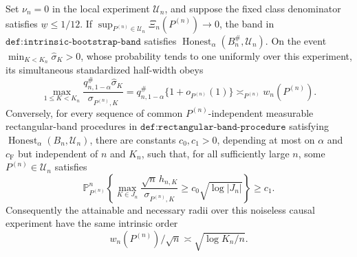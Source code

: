 Set \(\nu_n=0\) in the local experiment \(\mathcal U_n\), and suppose the fixed class denominator satisfies \(\underline w\leq1/12\).  If \(\sup_{P^{(n)}\in\mathcal U_n}\Xi_n(P^{(n)})\to0\), the band in \(\texttt{def:intrinsic-bootstrap-band}\) satisfies \(\operatorname{Honest}_{\alpha}(B_n^{\#},\mathcal U_n)\).  On the event \(\min_{K<K_n}\widehat\sigma_K>0\), whose probability tends to one uniformly over this experiment, its simultaneous standardized half-width obeys
\[
 \max_{1\leq K<K_n}\frac{q_{n,1-\alpha}^{\#}\widehat\sigma_K}{\sigma_{P^{(n)},K}}
 =q_{n,1-\alpha}^{\#}\{1+o_{P^{(n)}}(1)\}
 \asymp_{P^{(n)}}w_n(P^{(n)}).
\]
Conversely, for every sequence of common \(P^{(n)}\)-independent measurable rectangular-band procedures in \(\texttt{def:rectangular-band-procedure}\) satisfying \(\operatorname{Honest}_{\alpha}(B_n,\mathcal U_n)\), there are constants \(c_0,c_1>0\), depending at most on \(\alpha\) and \(c_{\mathrm F}\) but independent of \(n\) and \(K_n\), such that, for all sufficiently large \(n\), some \(P^{(n)}\in\mathcal U_n\) satisfies
\[
 \mathbb P_{P^{(n)}}^n\left\{\max_{K\in J_n}\frac{\sqrt n\,h_{n,K}}{\sigma_{P^{(n)},K}}
 \geq c_0\sqrt{\log|J_n|}\right\}\geq c_1.
\]
Consequently the attainable and necessary radii over this noiseless causal experiment have the same intrinsic order
\[
 w_n(P^{(n)})/\sqrt n\asymp\sqrt{\log K_n/n}.
\]